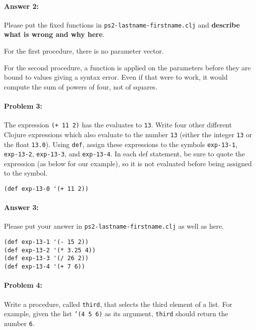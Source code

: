 \documentclass[10pt]{article}
\newcommand{\PSnum}{2}
\begin{document}
\paragraph{Answer 2:} Please put the fixed functions in
\texttt{ps\PSnum-lastname-firstname.clj} and
\textbf{describe what is wrong and why here}.

For the first procedure, there is no parameter vector. 

For the second procedure, a function is applied on the parameters before they are bound to values giving a syntax error. Even if that were to work, it would compute the sum of powers of four, not of squares.

\noindent\hrulefill %

\paragraph{Problem 3:}
The expression \texttt{(+ 11 2)} has the evaluates to \texttt{13}. Write four
other different Clojure expressions which also evaluate to the number
\texttt{13} (either the integer \texttt{13} or the float \texttt{13.0}).
Using \texttt{def}, assign these expressions to the symbols
\texttt{exp-13-1}, \texttt{exp-13-2}, \texttt{exp-13-3}, and
\texttt{exp-13-4}.  
In each def statement, be sure to quote the expression (as below for our example),
so it is not evaluated before being assigned to the symbol.

\begin{lstlisting}
(def exp-13-0 '(+ 11 2))
\end{lstlisting}

\paragraph{Answer 3:} Please put your answer in \texttt{ps\PSnum-lastname-firstname.clj} as
well as here.

\begin{lstlisting}
(def exp-13-1 '(- 15 2))
(def exp-13-2 '(* 3.25 4))
(def exp-13-3 '(/ 26 2))
(def exp-13-4 '(+ 7 6))
\end{lstlisting}


\noindent\hrulefill %

\paragraph{Problem 4:}
  Write a procedure, called \texttt{third}, that selects the third
  element of a list. For example, given the list \texttt{'(4 5 6)}
  as its argument, \texttt{third} should return the number \texttt{6}.
\end{document}

